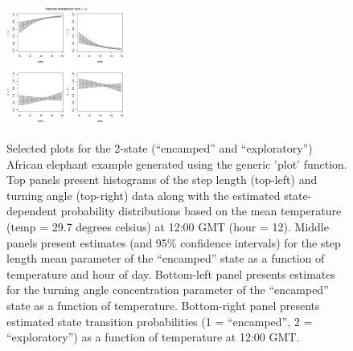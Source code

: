 \documentclass[12pt]{article}\usepackage[]{graphicx}\usepackage[]{xcolor}
\begin{document}
\begin{figure}[htbp]
  \includegraphics[width=0.35\textwidth]{plot_elephantResults013.pdf} \\
  \caption{Selected plots for the 2-state (``encamped'' and ``exploratory'') African elephant example generated using the generic 'plot' function. Top panels present histograms of the step length (top-left) and turning angle (top-right) data along with the estimated state-dependent probability distributions based on the mean temperature (temp = 29.7 degrees celsius) at 12:00 GMT (hour = 12). Middle panels present estimates (and 95\% confidence intervals) for the step length mean parameter of the ``encamped'' state as a function of temperature and hour of day.  Bottom-left panel presents estimates for the turning angle concentration parameter of the ``encamped'' state as a function of temperature.  Bottom-right panel presents estimated state transition probabilities (1 = ``encamped'', 2 = ``exploratory'') as a function of temperature at 12:00 GMT.}
  \label{fig:elephantResults2}
\end{figure}
\end{document}
